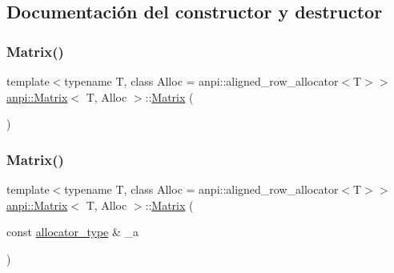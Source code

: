 \subsection{Documentación del constructor y destructor}
\mbox{\label{classanpi_1_1Matrix_a4b039deade03b4163486c8bc02309f14}} 
\subsubsection{\texorpdfstring{Matrix()}{Matrix()}\hspace{0.1cm}{\footnotesize\ttfamily [1/17]}}
{\footnotesize\ttfamily template$<$typename T, class Alloc = anpi\+::aligned\+\_\+row\+\_\+allocator$<$\+T$>$$>$ \\
\hyperlink{classanpi_1_1Matrix}{anpi\+::\+Matrix}$<$ T, Alloc $>$\+::\hyperlink{classanpi_1_1Matrix}{Matrix} (\begin{DoxyParamCaption}{ }\end{DoxyParamCaption})}

\mbox{\label{classanpi_1_1Matrix_a348dd0fe5804e67d54152f10100fda47}} 
\subsubsection{\texorpdfstring{Matrix()}{Matrix()}\hspace{0.1cm}{\footnotesize\ttfamily [2/17]}}
{\footnotesize\ttfamily template$<$typename T, class Alloc = anpi\+::aligned\+\_\+row\+\_\+allocator$<$\+T$>$$>$ \\
\hyperlink{classanpi_1_1Matrix}{anpi\+::\+Matrix}$<$ T, Alloc $>$\+::\hyperlink{classanpi_1_1Matrix}{Matrix} (\begin{DoxyParamCaption}\item[{const \hyperlink{classanpi_1_1Matrix_a3574b7528e3ddfb2f7cdf446be8286c1}{allocator\+\_\+type} \&}]{\+\_\+a }\end{DoxyParamCaption})\hspace{0.3cm}{\ttfamily [noexcept]}}

\mbox{\label{classanpi_1_1Matrix_abf385754354f6558e6b9e4df8103efc2}} 
